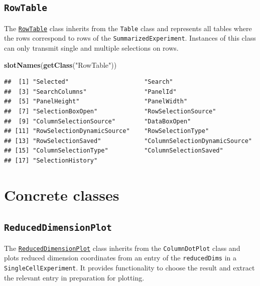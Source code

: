 \documentclass[
]{book}
\newenvironment{Shaded}{\begin{snugshade}}{\end{snugshade}}
\newcommand{\KeywordTok}[1]{\textcolor[rgb]{0.13,0.29,0.53}{\textbf{#1}}}
\newcommand{\NormalTok}[1]{#1}
\newcommand{\StringTok}[1]{\textcolor[rgb]{0.31,0.60,0.02}{#1}}
\begin{document}
\hypertarget{rowtable}{%
\subsection{\texorpdfstring{\texttt{RowTable}}{RowTable}}\label{rowtable}}

The \href{https://isee.github.io/iSEE/reference/RowTable-class.html}{\texttt{RowTable}} class inherits from the \texttt{Table} class and represents all tables where the rows correspond to rows of the \texttt{SummarizedExperiment}.
Instances of this class can only transmit single and multiple selections on rows.

\begin{Shaded}
\begin{Highlighting}[]
\KeywordTok{slotNames}\NormalTok{(}\KeywordTok{getClass}\NormalTok{(}\StringTok{"RowTable"}\NormalTok{))}
\end{Highlighting}
\end{Shaded}

\begin{verbatim}
##  [1] "Selected"                     "Search"                      
##  [3] "SearchColumns"                "PanelId"                     
##  [5] "PanelHeight"                  "PanelWidth"                  
##  [7] "SelectionBoxOpen"             "RowSelectionSource"          
##  [9] "ColumnSelectionSource"        "DataBoxOpen"                 
## [11] "RowSelectionDynamicSource"    "RowSelectionType"            
## [13] "RowSelectionSaved"            "ColumnSelectionDynamicSource"
## [15] "ColumnSelectionType"          "ColumnSelectionSaved"        
## [17] "SelectionHistory"
\end{verbatim}

\hypertarget{concrete-classes}{%
\section{Concrete classes}\label{concrete-classes}}

\hypertarget{reduceddimensionplot}{%
\subsection{\texorpdfstring{\texttt{ReducedDimensionPlot}}{ReducedDimensionPlot}}\label{reduceddimensionplot}}

The \href{https://isee.github.io/iSEE/reference/ReducedDimensionPlot-class.html}{\texttt{ReducedDimensionPlot}} class inherits from the \texttt{ColumnDotPlot} class and plots reduced dimension coordinates from an entry of the \texttt{reducedDims} in a \texttt{SingleCellExperiment}.
It provides functionality to choose the result and extract the relevant entry in preparation for plotting.
\end{document}
